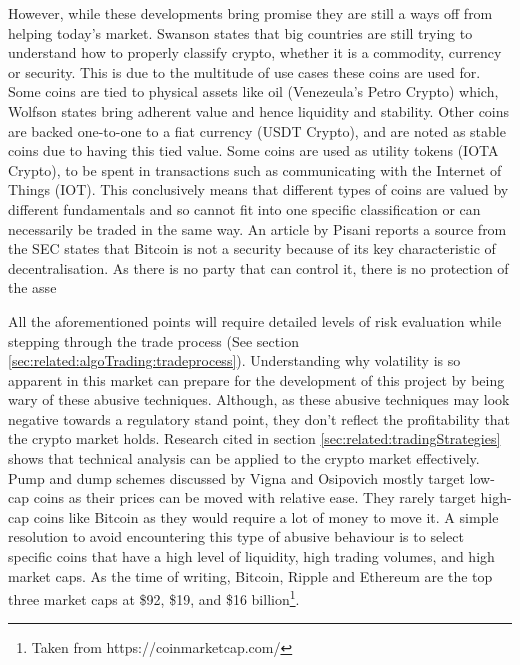However, while these developments bring promise they are still a ways off from helping today's market. Swanson \cite{ART:ELLIS:2018} states that big countries are still trying to understand how to properly classify crypto, whether it is a commodity, currency or security. This is due to the multitude of use cases these coins are used for. Some coins are tied to physical assets like oil (Venezeula's Petro Crypto) which, Wolfson \cite{ART:WOLFSON:2018} states bring adherent value and hence liquidity and stability. Other coins are backed one-to-one to a fiat currency (USDT Crypto), and are noted as stable coins due to having this tied value. Some coins are used as utility tokens (IOTA Crypto), to be spent in transactions such as communicating with the Internet of Things (IOT). This conclusively means that different types of coins are valued by different fundamentals and so cannot fit into one specific classification or can necessarily be traded in the same way. An article by Pisani reports a source from the SEC states that Bitcoin is not a security because of its key characteristic of decentralisation. As there is no party that can control it, there is no protection of the asse

All the aforementioned points will require detailed levels of risk evaluation while stepping through the trade process (See section \ref{sec:related:algoTrading:tradeprocess}). Understanding why volatility is so apparent in this market can prepare for the development of this project by being wary of these abusive techniques. Although, as these abusive techniques may look negative towards a regulatory stand point, they don't reflect the profitability that the crypto market holds. Research cited in section \ref{sec:related:tradingStrategies} shows that technical analysis can be applied to the crypto market effectively. Pump and dump schemes discussed by Vigna and Osipovich \cite{ART:VIGNA:2018} mostly target low-cap coins as their prices can be moved with relative ease. They rarely target high-cap coins like Bitcoin as they would require a lot of money to move it. A simple resolution to avoid encountering this type of abusive behaviour is to select specific coins that have a high level of liquidity, high trading volumes, and high market caps. As the time of writing, Bitcoin, Ripple and Ethereum are the top three market caps at \$92, \$19, and \$16 billion\footnote{Taken from https://coinmarketcap.com/}.  


